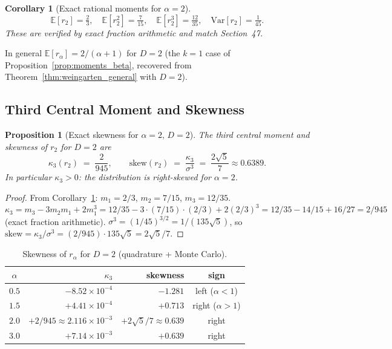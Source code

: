 \documentclass[12pt,a4paper]{article}
\newtheorem{proposition}[theorem]{Proposition}
\newtheorem{corollary}[theorem]{Corollary}
\begin{document}
\begin{corollary}[Exact rational moments for $\alpha=2$]\label{cor:exact_moments_a2}
\[
  \mathbb{E}[r_2]=\tfrac{2}{3},\quad
  \mathbb{E}[r_2^2]=\tfrac{7}{15},\quad
  \mathbb{E}[r_2^3]=\tfrac{12}{35},\quad
  \mathrm{Var}[r_2]=\tfrac{1}{45}.
\]
These are verified by exact fraction arithmetic and match Section~47.
\end{corollary}

In general $\mathbb{E}[r_\alpha]=2/(\alpha+1)$ for $D=2$ (the $k=1$ case of
Proposition~\ref{prop:moments_beta}, recovered from
Theorem~\ref{thm:weingarten_general} with $D=2$).

\subsection{Third Central Moment and Skewness}
\label{subsec:skewness}

\begin{proposition}[Exact skewness for $\alpha=2$, $D=2$]\label{prop:kappa3}
The third central moment and skewness of $r_2$ for $D=2$ are
\[
  \kappa_3(r_2)\;=\;\frac{2}{945},\qquad
  \mathrm{skew}(r_2)\;=\;\frac{\kappa_3}{\sigma^3}\;=\;\frac{2\sqrt{5}}{7}\approx0.6389.
\]
In particular $\kappa_3>0$: the distribution is \emph{right-skewed} for $\alpha=2$.
\end{proposition}

\begin{proof}
From Corollary~\ref{cor:exact_moments_a2}: $m_1=2/3$, $m_2=7/15$, $m_3=12/35$.
$\kappa_3=m_3-3m_2 m_1+2m_1^3 = 12/35 - 3\cdot(7/15)\cdot(2/3) + 2(2/3)^3
= 12/35-14/15+16/27 = 2/945$ (exact fraction arithmetic).
$\sigma^3=(1/45)^{3/2}=1/(135\sqrt5)$, so
$\mathrm{skew}=\kappa_3/\sigma^3=(2/945)\cdot135\sqrt5=2\sqrt5/7$.
\end{proof}

\begin{table}[h]
\centering
\caption{Skewness of $r_\alpha$ for $D=2$ (quadrature + Monte Carlo).}
\label{tab:skewness}
\begin{tabular}{c|rr|c}
\hline
$\alpha$ & $\kappa_3$ & skewness & sign \\
\hline
$0.5$ & $-8.52\times10^{-4}$ & $-1.281$ & left ($\alpha<1$) \\
$1.5$ & $+4.41\times10^{-4}$ & $+0.713$ & right ($\alpha>1$) \\
$2.0$ & $+2/945\approx2.116\times10^{-3}$ & $+2\sqrt5/7\approx0.639$ & right \\
$3.0$ & $+7.14\times10^{-3}$ & $+0.639$ & right \\
\hline
\end{tabular}
\end{table}
\end{document}
